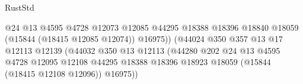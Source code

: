 \begin{lexlean}{RustStd}
\begin{coremodule}
                                                            @24
                                                            @13
                                                            @4595
                                                            @4728
                                                            @12073
                                                            @12085
                                                            @44295
                                                            @18388
                                                            @18396
                                                            @18840
                                                            @18059
                                                            (@15844 (@18415 @12085 @12074))
                                                            @16975))
                                                        (@44024
                                                          @350
                                                          @357
                                                          @13
                                                          @17
                                                          @12113
                                                          @12139
                                                          (@44032
                                                            @350
                                                            @13
                                                            @12113
                                                            (@44280
                                                              @202
                                                              @24
                                                              @13
                                                              @4595
                                                              @4728
                                                              @12095
                                                              @12108
                                                              @44295
                                                              @18388
                                                              @18396
                                                              @18923
                                                              @18059
                                                              (@15844 (@18415 @12108 @12096))
                                                              @16975))

\end{coremodule}
\end{lexlean}
